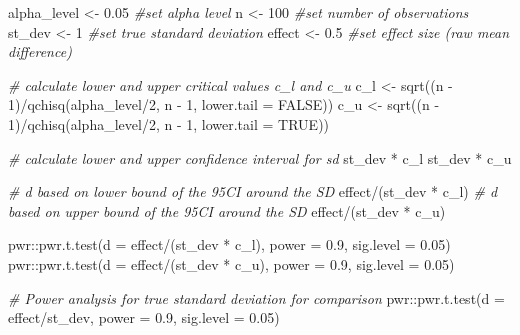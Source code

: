 \documentclass[
]{krantz}
\newenvironment{Shaded}{\begin{snugshade}}{\end{snugshade}}
\newcommand{\AttributeTok}[1]{\textcolor[rgb]{0.77,0.63,0.00}{#1}}
\newcommand{\CommentTok}[1]{\textcolor[rgb]{0.56,0.35,0.01}{\textit{#1}}}
\newcommand{\ConstantTok}[1]{\textcolor[rgb]{0.00,0.00,0.00}{#1}}
\newcommand{\DecValTok}[1]{\textcolor[rgb]{0.00,0.00,0.81}{#1}}
\newcommand{\FloatTok}[1]{\textcolor[rgb]{0.00,0.00,0.81}{#1}}
\newcommand{\FunctionTok}[1]{\textcolor[rgb]{0.00,0.00,0.00}{#1}}
\newcommand{\NormalTok}[1]{#1}
\newcommand{\OtherTok}[1]{\textcolor[rgb]{0.56,0.35,0.01}{#1}}
\newcommand{\SpecialCharTok}[1]{\textcolor[rgb]{0.00,0.00,0.00}{#1}}
\begin{document}
\begin{Shaded}
\begin{Highlighting}[]
\NormalTok{alpha\_level }\OtherTok{\textless{}{-}} \FloatTok{0.05} \CommentTok{\#set alpha level}
\NormalTok{n }\OtherTok{\textless{}{-}} \DecValTok{100} \CommentTok{\#set number of observations}
\NormalTok{st\_dev }\OtherTok{\textless{}{-}} \DecValTok{1} \CommentTok{\#set true standard deviation}
\NormalTok{effect }\OtherTok{\textless{}{-}} \FloatTok{0.5} \CommentTok{\#set effect size (raw mean difference)}

\CommentTok{\# calculate lower and upper critical values c\_l and c\_u}
\NormalTok{c\_l }\OtherTok{\textless{}{-}} \FunctionTok{sqrt}\NormalTok{((n }\SpecialCharTok{{-}} \DecValTok{1}\NormalTok{)}\SpecialCharTok{/}\FunctionTok{qchisq}\NormalTok{(alpha\_level}\SpecialCharTok{/}\DecValTok{2}\NormalTok{, n }\SpecialCharTok{{-}} \DecValTok{1}\NormalTok{, }\AttributeTok{lower.tail =} \ConstantTok{FALSE}\NormalTok{))}
\NormalTok{c\_u }\OtherTok{\textless{}{-}} \FunctionTok{sqrt}\NormalTok{((n }\SpecialCharTok{{-}} \DecValTok{1}\NormalTok{)}\SpecialCharTok{/}\FunctionTok{qchisq}\NormalTok{(alpha\_level}\SpecialCharTok{/}\DecValTok{2}\NormalTok{, n }\SpecialCharTok{{-}} \DecValTok{1}\NormalTok{, }\AttributeTok{lower.tail =} \ConstantTok{TRUE}\NormalTok{))}

\CommentTok{\# calculate lower and upper confidence interval for sd}
\NormalTok{st\_dev }\SpecialCharTok{*}\NormalTok{ c\_l}
\NormalTok{st\_dev }\SpecialCharTok{*}\NormalTok{ c\_u}

\CommentTok{\# d based on lower bound of the 95CI around the SD}
\NormalTok{effect}\SpecialCharTok{/}\NormalTok{(st\_dev }\SpecialCharTok{*}\NormalTok{ c\_l)}
\CommentTok{\# d based on upper bound of the 95CI around the SD}
\NormalTok{effect}\SpecialCharTok{/}\NormalTok{(st\_dev }\SpecialCharTok{*}\NormalTok{ c\_u)}

\NormalTok{pwr}\SpecialCharTok{::}\FunctionTok{pwr.t.test}\NormalTok{(}\AttributeTok{d =}\NormalTok{ effect}\SpecialCharTok{/}\NormalTok{(st\_dev }\SpecialCharTok{*}\NormalTok{ c\_l), }\AttributeTok{power =} \FloatTok{0.9}\NormalTok{, }\AttributeTok{sig.level =} \FloatTok{0.05}\NormalTok{)}
\NormalTok{pwr}\SpecialCharTok{::}\FunctionTok{pwr.t.test}\NormalTok{(}\AttributeTok{d =}\NormalTok{ effect}\SpecialCharTok{/}\NormalTok{(st\_dev }\SpecialCharTok{*}\NormalTok{ c\_u), }\AttributeTok{power =} \FloatTok{0.9}\NormalTok{, }\AttributeTok{sig.level =} \FloatTok{0.05}\NormalTok{)}

\CommentTok{\# Power analysis for true standard deviation for comparison}
\NormalTok{pwr}\SpecialCharTok{::}\FunctionTok{pwr.t.test}\NormalTok{(}\AttributeTok{d =}\NormalTok{ effect}\SpecialCharTok{/}\NormalTok{st\_dev, }\AttributeTok{power =} \FloatTok{0.9}\NormalTok{, }\AttributeTok{sig.level =} \FloatTok{0.05}\NormalTok{)}
\end{Highlighting}
\end{Shaded}
\end{document}
